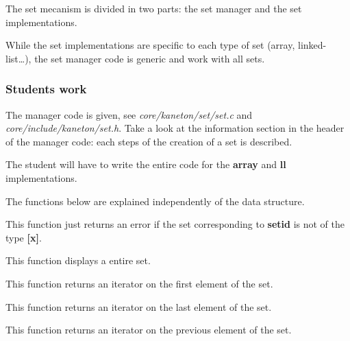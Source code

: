The set mecanism is divided in  two parts: the set manager and the set
implementations.

While the set implementations are specific to each type of set (array,
linked-list\ldots), the set manager code  is generic and work with all
sets.

\subsubsection{Students work}

The  manager code  is given,  see  \textit{core/kaneton/set/set.c} and
\textit{core/include/kaneton/set.h}.  Take a  look at  the information
section in the header of the  manager code: each steps of the creation
of a set is described.

The student will have to  write the entire code for the \textbf{array}
and \textbf{ll} implementations.

The functions below are explained independently of the data structure.


This function just returns an error if the set corresponding to
\textbf{setid} is not of the type \textbf{[x]}.


This function displays a entire set.


This function returns an iterator on the first element of the set.


This function returns an iterator on the last element of the set.


This function returns an iterator on the previous element of the set.



